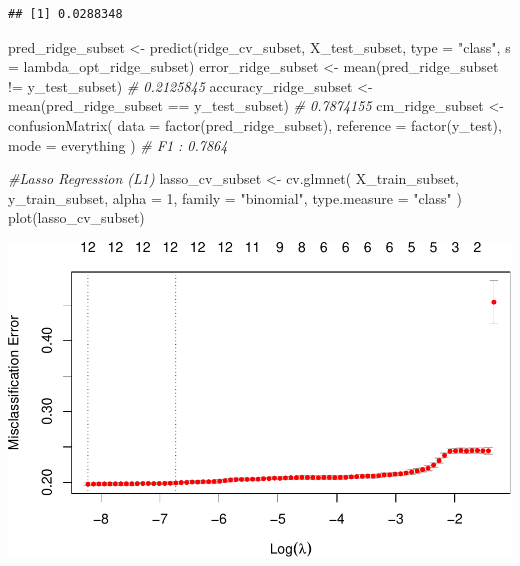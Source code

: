 \documentclass[
]{article}
\newenvironment{Shaded}{\begin{snugshade}}{\end{snugshade}}
\newcommand{\AttributeTok}[1]{\textcolor[rgb]{0.77,0.63,0.00}{#1}}
\newcommand{\CommentTok}[1]{\textcolor[rgb]{0.56,0.35,0.01}{\textit{#1}}}
\newcommand{\DecValTok}[1]{\textcolor[rgb]{0.00,0.00,0.81}{#1}}
\newcommand{\FunctionTok}[1]{\textcolor[rgb]{0.00,0.00,0.00}{#1}}
\newcommand{\NormalTok}[1]{#1}
\newcommand{\OtherTok}[1]{\textcolor[rgb]{0.56,0.35,0.01}{#1}}
\newcommand{\SpecialCharTok}[1]{\textcolor[rgb]{0.00,0.00,0.00}{#1}}
\newcommand{\StringTok}[1]{\textcolor[rgb]{0.31,0.60,0.02}{#1}}
\begin{document}
\begin{verbatim}
## [1] 0.0288348
\end{verbatim}

\begin{Shaded}
\begin{Highlighting}[]
\NormalTok{pred\_ridge\_subset }\OtherTok{\textless{}{-}}
  \FunctionTok{predict}\NormalTok{(ridge\_cv\_subset, X\_test\_subset, }\AttributeTok{type =} \StringTok{"class"}\NormalTok{, }
          \AttributeTok{s =}\NormalTok{ lambda\_opt\_ridge\_subset)}
\NormalTok{error\_ridge\_subset }\OtherTok{\textless{}{-}}
  \FunctionTok{mean}\NormalTok{(pred\_ridge\_subset }\SpecialCharTok{!=}\NormalTok{ y\_test\_subset) }\CommentTok{\# 0.2125845}
\NormalTok{accuracy\_ridge\_subset }\OtherTok{\textless{}{-}}
  \FunctionTok{mean}\NormalTok{(pred\_ridge\_subset }\SpecialCharTok{==}\NormalTok{ y\_test\_subset) }\CommentTok{\# 0.7874155}
\NormalTok{cm\_ridge\_subset }\OtherTok{\textless{}{-}}
  \FunctionTok{confusionMatrix}\NormalTok{(}
    \AttributeTok{data =} \FunctionTok{factor}\NormalTok{(pred\_ridge\_subset),}
    \AttributeTok{reference =} \FunctionTok{factor}\NormalTok{(y\_test),}
    \AttributeTok{mode =} \StringTok{\textquotesingle{}everything\textquotesingle{}}
\NormalTok{  ) }\CommentTok{\# F1 : 0.7864}

\CommentTok{\#Lasso Regression (L1)}
\NormalTok{lasso\_cv\_subset }\OtherTok{\textless{}{-}}
  \FunctionTok{cv.glmnet}\NormalTok{(}
\NormalTok{    X\_train\_subset,}
\NormalTok{    y\_train\_subset,}
    \AttributeTok{alpha =} \DecValTok{1}\NormalTok{,}
    \AttributeTok{family =} \StringTok{"binomial"}\NormalTok{,}
    \AttributeTok{type.measure =} \StringTok{"class"}
\NormalTok{  )}
\FunctionTok{plot}\NormalTok{(lasso\_cv\_subset)}
\end{Highlighting}
\end{Shaded}

\includegraphics{Rain_Australia_files/figure-latex/unnamed-chunk-2-2.pdf}
\end{document}
